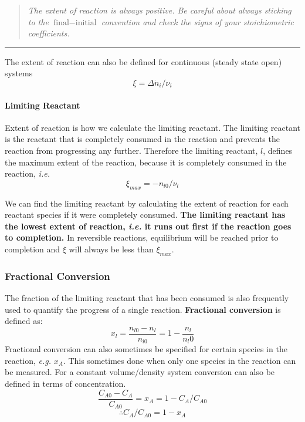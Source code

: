 \documentclass[
]{article}
\begin{document}
\begin{quote}
\emph{The extent of reaction is always positive. Be careful about always sticking to the \(\text{final} - \text{initial}\) convention and check the signs of your stoichiometric coefficients.}
\end{quote}

\begin{center}\rule{0.5\linewidth}{0.5pt}\end{center}

The extent of reaction can also be defined for continuous (steady state open) systems
\[\xi = \Delta \dot n_i/\nu_i\]

\hypertarget{limiting-reactant}{%
\paragraph{Limiting Reactant}\label{limiting-reactant}}

Extent of reaction is how we calculate the limiting reactant. The limiting reactant is the reactant that is completely consumed in the reaction and prevents the reaction from progressing any further. Therefore the limiting reactant, \(l\), defines the maximum extent of the reaction, because it is completely consumed in the reaction, \emph{i.e.}
\[\xi_{max} = -n_{l0}/\nu_l\]

We can find the limiting reactant by calculating the extent of reaction for each reactant species if it were completely consumed. \textbf{The limiting reactant has the lowest extent of reaction, \emph{i.e.} it runs out first if the reaction goes to completion.} In reversible reactions, equilibrium will be reached prior to completion and \(\xi\) will always be less than \(\xi_{max}\).

\hypertarget{fractional-conversion}{%
\subsubsection{Fractional Conversion}\label{fractional-conversion}}

The fraction of the limiting reactant that has been consumed is also frequently used to quantify the progress of a single reaction. \textbf{Fractional conversion} is defined as:
\[x_l = \frac{n_{l0} - n_l}{n_{l0}} = 1 - \frac{n_l}{n_l0} \label{eq:frac-conv}\]
Fractional conversion can also sometimes be specified for certain species in the reaction, \emph{e.g.} \(x_A\). This sometimes done when only one species in the reaction can be measured.
For a constant volume/density system conversion can also be defined in terms of concentration.
\[\frac{C_{A0} - C_{A}}{C_{A0}} = x_A = 1-C_A/C_{A0}\]
\[\therefore C_A/C_{A0} = 1-x_A\]
\end{document}
